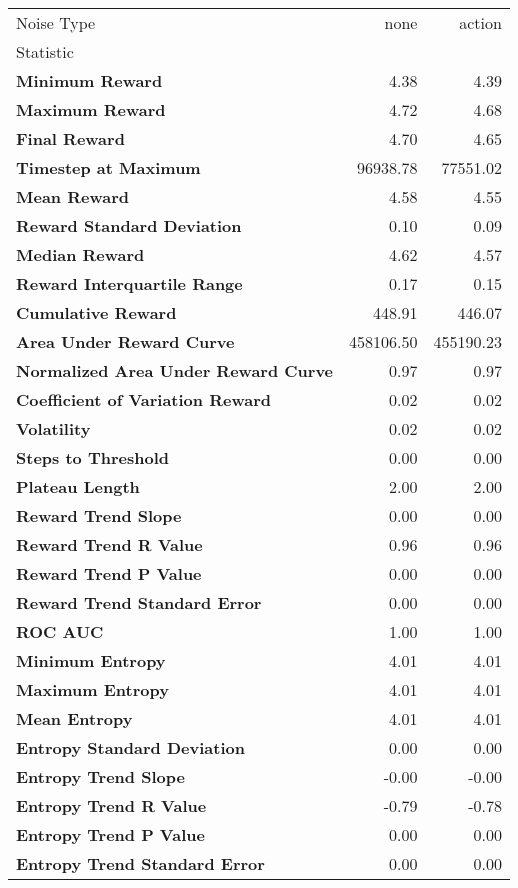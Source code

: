 \begin{tabular}{lrr}
\toprule
Noise Type & none & action \\
Statistic &  &  \\
\midrule
\textbf{Minimum Reward} & 4.38 & 4.39 \\
\textbf{Maximum Reward} & 4.72 & 4.68 \\
\textbf{Final Reward} & 4.70 & 4.65 \\
\textbf{Timestep at Maximum} & 96938.78 & 77551.02 \\
\textbf{Mean Reward} & 4.58 & 4.55 \\
\textbf{Reward Standard Deviation} & 0.10 & 0.09 \\
\textbf{Median Reward} & 4.62 & 4.57 \\
\textbf{Reward Interquartile Range} & 0.17 & 0.15 \\
\textbf{Cumulative Reward} & 448.91 & 446.07 \\
\textbf{Area Under Reward Curve} & 458106.50 & 455190.23 \\
\textbf{Normalized Area Under Reward Curve} & 0.97 & 0.97 \\
\textbf{Coefficient of Variation Reward} & 0.02 & 0.02 \\
\textbf{Volatility} & 0.02 & 0.02 \\
\textbf{Steps to Threshold} & 0.00 & 0.00 \\
\textbf{Plateau Length} & 2.00 & 2.00 \\
\textbf{Reward Trend Slope} & 0.00 & 0.00 \\
\textbf{Reward Trend R Value} & 0.96 & 0.96 \\
\textbf{Reward Trend P Value} & 0.00 & 0.00 \\
\textbf{Reward Trend Standard Error} & 0.00 & 0.00 \\
\textbf{ROC AUC} & 1.00 & 1.00 \\
\textbf{Minimum Entropy} & 4.01 & 4.01 \\
\textbf{Maximum Entropy} & 4.01 & 4.01 \\
\textbf{Mean Entropy} & 4.01 & 4.01 \\
\textbf{Entropy Standard Deviation} & 0.00 & 0.00 \\
\textbf{Entropy Trend Slope} & -0.00 & -0.00 \\
\textbf{Entropy Trend R Value} & -0.79 & -0.78 \\
\textbf{Entropy Trend P Value} & 0.00 & 0.00 \\
\textbf{Entropy Trend Standard Error} & 0.00 & 0.00 \\
\bottomrule
\end{tabular}
